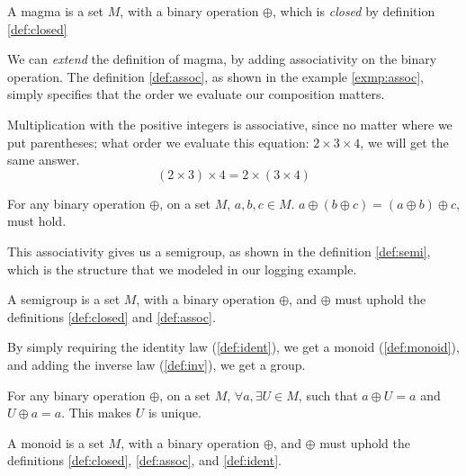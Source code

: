 \begin{definition}[Magma] \label{def:magma}
  A magma is a set $M$, with a binary operation $\oplus$, which is
  \textit{closed} by definition \ref{def:closed}
\end{definition}

We can \textit{extend} the definition of magma, by adding associativity on the
binary operation. The definition \ref{def:assoc}, as shown in the example
\ref{exmp:assoc},
simply specifies that the order we evaluate our composition matters.

\begin{exmp} \label{exmp:assoc}
  Multiplication with the positive integers is associative, since no matter
  where we put parentheses; what order we evaluate this equation:
  $2 \times 3 \times 4$, we will get the same answer.
  $$
  (2 \times 3) \times 4 = 2 \times (3 \times 4)
  $$
\end{exmp}

\begin{definition} \label{def:assoc}
  For any binary operation $\oplus$, on a set $M$, $a, b, c \in M$.
  $a \oplus \left ( b \oplus c \right ) = \left ( a \oplus b \right ) \oplus c$,
  must hold.
\end{definition}

This associativity gives us a semigroup, as shown in the definition
\ref{def:semi}, which is the structure that we modeled in our logging example.

\begin{definition}[Semigroup] \label{def:semi}
  A semigroup is a set $M$, with a binary operation $\oplus$, and $\oplus$ must
  uphold the definitions \ref{def:closed} and \ref{def:assoc}.
\end{definition}

By simply requiring the identity law (\ref{def:ident}), we get a
monoid (\ref{def:monoid}), and adding the inverse law
(\ref{def:inv}), we get a group.

\begin{definition} \label{def:ident}
  For any binary operation $\oplus$, on a set $M$, $\forall a, \exists U \in M$,
  such that $a \oplus U = a$ and $U \oplus a = a$. This makes $U$ is unique.
\end{definition}

\begin{definition}[Monoid] \label{def:monoid}
  A monoid is a set $M$, with a binary operation $\oplus$, and $\oplus$ must
  uphold the definitions \ref{def:closed}, \ref{def:assoc}, and \ref{def:ident}.
\end{definition}

